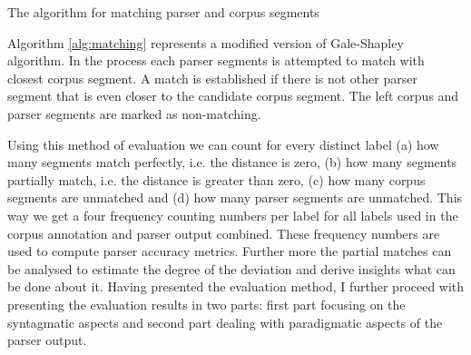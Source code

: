     \noindent
    \begin{algorithm}[!ht]\small
        \Input{\aslist, \mslist} %
        \caption{The algorithm for matching parser and corpus segments}
        \label{alg:matching}
    \end{algorithm}

    Algorithm \ref{alg:matching} represents a modified version of Gale-Shapley algorithm. In the process each parser segments is attempted to match with closest corpus segment. A match is established if there is not other parser segment that is even closer to the candidate corpus segment. The left corpus and parser segments are marked as non-matching.

    Using this method of evaluation we can count for every distinct label (a) how many segments match perfectly, i.e. the distance is zero, (b) how many segments partially match, i.e. the distance is greater than zero, (c) how many corpus segments are unmatched and (d) how many parser segments are unmatched. This way we get a four frequency counting numbers per label for all labels used in the corpus annotation and parser output combined. These frequency numbers are used to compute parser accuracy metrics. Further more the partial matches can be analysed to estimate the degree of the deviation and derive insights what can be done about it. Having presented the evaluation method, I further proceed with presenting the evaluation results in two parts: first part focusing on the syntagmatic aspects and second part dealing with paradigmatic aspects of the parser output. 

